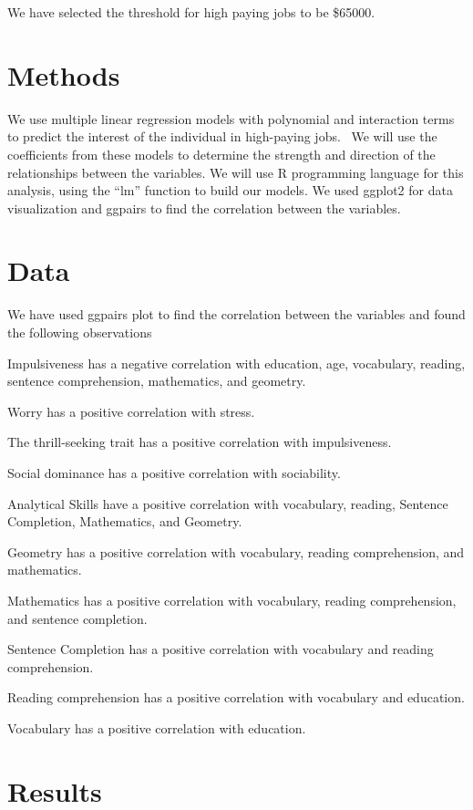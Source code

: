 \documentclass[
]{article}
\begin{document}
We have selected the threshold for high paying jobs to be \$65000.

\hypertarget{methods}{%
\section{Methods}\label{methods}}

We use multiple linear regression models with polynomial and interaction
terms to predict the interest of the individual in high-paying jobs.~ We
will use the coefficients from these models to determine the strength
and direction of the relationships between the variables. We will use R
programming language for this analysis, using the ``lm'' function to
build our models. We used ggplot2 for data visualization and ggpairs to
find the correlation between the variables.~

\hypertarget{data}{%
\section{Data}\label{data}}

We have used ggpairs plot to find the correlation between the variables
and found the following observations

Impulsiveness has a negative correlation with education, age,
vocabulary, reading, sentence comprehension, mathematics, and geometry.

Worry has a positive correlation with stress.

The thrill-seeking trait has a positive correlation with impulsiveness.

Social dominance has a positive correlation with sociability.

Analytical Skills have a positive correlation with vocabulary, reading,
Sentence Completion, Mathematics, and Geometry.

Geometry has a positive correlation with vocabulary, reading
comprehension, and mathematics.

Mathematics has a positive correlation with vocabulary, reading
comprehension, and sentence completion.

Sentence Completion has a positive correlation with vocabulary and
reading comprehension.

Reading comprehension has a positive correlation with vocabulary and
education.

Vocabulary has a positive correlation with education.

\hypertarget{results}{%
\section{Results}\label{results}}
\end{document}
